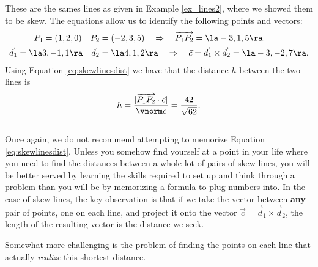 {These are the sames lines as given in Example \ref{ex_lines2}, where we showed them to be skew. The equations allow us to identify the following points and vectors:
\begin{align*}
P_1 = (1,2,0)\quad P_2 &= (-2,3,5) \quad \Rightarrow \quad \overrightarrow{P_1P_2} = \la -3,1,5\ra.\\
\vec d_1 = \la 3,-1,1\ra \quad \vec d_2 &= \la 4,1,2\ra \quad \Rightarrow \quad \vec c = \vec d_1\times \vec d_2 = \la -3,-2,7\ra.
\end{align*}
Using Equation \eqref{eq:skewlinesdist} we have that the distance $h$ between the two lines is
\[
h = \frac{|\overrightarrow{P_1P_2}\cdot \vec c|}{\vnorm c}=\frac{42}{\sqrt{62}}.
\]
}\\

Once again, we do not recommend attempting to memorize Equation \eqref{eq:skewlinesdist}. Unless you somehow find yourself at a point in your life where you need to find the distances between a whole lot of pairs of skew lines, you will be better served by learning the skills required to set up and think through a problem than you will be by memorizing a formula to plug numbers into. In the case of skew lines, the key observation is that if we take the vector between \textbf{any} pair of points, one on each line, and project it onto the vector $\vec c = \vec{d}_1\times\vec{d}_2$, the length of the resulting vector is the distance we seek.

Somewhat more challenging is the problem of finding the points on each line that actually \textit{realize} this shortest distance.\\

